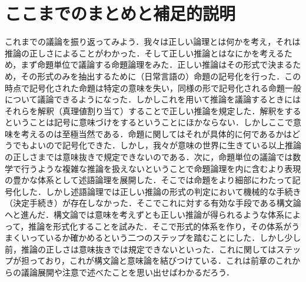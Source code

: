 \documentclass[10pt,b5paper,papersize,dvipdfmx]{jsbook}
\begin{document}
\section{ここまでのまとめと補足的説明}
これまでの議論を振り返ってみよう．我々は正しい論理とは何かを考え，それは推論の正しさによることがわかった．そして正しい推論とはなにかを考えるため，まず命題単位で議論する命題論理をみた．正しい推論はその形式で決まるため，その形式のみを抽出するために（日常言語の）命題の記号化を行った．この時点で記号化された命題は特定の意味を失い，同様の形で記号化される命題一般について議論できるようになった．しかしこれを用いて推論を議論するときにはそれらを解釈（真理値割り当て）することで正しい推論を規定した．解釈をするということは記号に意味づけをするということにほかならない．しかしここで意味を考えるのは至極当然である．命題に関してはそれが具体的に何であるかはどうでもよいので記号化できた．しかし，我々が意味の世界に生きている以上推論の正しさまでは意味抜きで規定できないのである．次に，命題単位の議論では数学で行うような複雑な推論を扱えないということで命題論理を内に含むより表現の豊かな体系として述語論理を展開した．そこでは命題をより細部にわたって記号化した．しかし述語論理では正しい推論の形式の判定において機械的な手続き（決定手続き）が存在しなかった．そこでこれに対する有効な手段である構文論へと進んだ．構文論では意味を考えずとも正しい推論が得られるような体系によって，推論を形式化することを試みた．そこで形式的体系を作り，その体系がうまくいっているか確かめるという二つのステップを踏むことにした．しかし少し前，推論の正しさは意味抜きでは規定できないといった．これに関してはステップが担っており，これが構文論と意味論を結びつけている．これは前章のこれからの議論展開や注意で述べたことを思い出せばわかるだろう．
\end{document}
